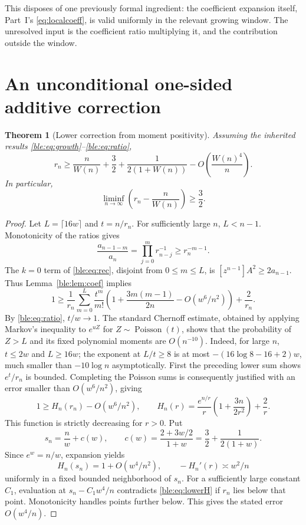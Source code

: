 \documentclass[11pt]{article}
\numberwithin{equation}{section}
\newtheorem{theorem}{Theorem}[section]
\theoremstyle{definition}
\theoremstyle{remark}
\begin{document}
This disposes of one previously formal ingredient: the coefficient
expansion itself, Part~I's \eqref{eq:localcoeff}, is valid uniformly in
the relevant growing window. The unresolved input is the coefficient ratio
multiplying it, and the contribution outside the window.

\section{An unconditional one-sided additive correction}\label{ble:sec:lower}
\begin{theorem}[Lower correction from moment positivity]\label{ble:thm:lower}
Assuming the inherited results \eqref{ble:eq:growth}--\eqref{ble:eq:ratio},
\begin{equation}\label{ble:eq:lower}
 r_n\ge \frac n{W(n)}+\frac32+\frac{1}{2(1+W(n))}
             -O\!\left(\frac{W(n)^4}{n}\right).
\end{equation}
In particular,
\[
 \liminf_{n\to\infty}\left(r_n-\frac n{W(n)}\right)\ge\frac32.
\]
\end{theorem}
\begin{proof}
Let $L=\lceil16w\rceil$ and $t=n/r_n$. For sufficiently large $n$,
$L<n-1$. Monotonicity of the ratios gives
\[
 \frac{a_{n-1-m}}{a_n}=\prod_{j=0}^{m}r_{n-j}^{-1}\ge r_n^{-m-1}.
\]
The $k=0$ term of \eqref{ble:eq:rec}, disjoint from $0\le m\le L$, is
$[z^{n-1}]A^2\ge2a_{n-1}$. Thus Lemma~\ref{ble:lem:coef} implies
\[
 1\ge \frac1{r_n}\sum_{m=0}^L\frac{t^m}{m!}
 \left(1+\frac{3m(m-1)}{2n}-O(w^6/n^2)\right)+\frac2{r_n}.
\]
By \eqref{ble:eq:ratio}, $t/w\to1$. The standard Chernoff estimate,
obtained by applying Markov's inequality to $e^{uZ}$ for
$Z\sim\operatorname{Poisson}(t)$, shows that the probability of $Z>L$ and
its fixed polynomial moments are $O(n^{-10})$. Indeed, for large $n$,
$t\le2w$ and $L\ge16w$; the exponent at $L/t\ge8$ is at most
$-(16\log8-16+2)w$, much smaller than $-10\log n$ asymptotically.
First the preceding lower sum shows $e^t/r_n$ is bounded. Completing the
Poisson sums is consequently justified with an error smaller than
$O(w^6/n^2)$, giving
\begin{equation}\label{ble:eq:lowerH}
 1\ge H_n(r_n)-O(w^6/n^2),\qquad
 H_n(r)=\frac{e^{n/r}}r\left(1+\frac{3n}{2r^2}\right)+\frac2r.
\end{equation}
This function is strictly decreasing for $r>0$. Put
\[
 s_n=\frac n w+c(w),\qquad
 c(w)=\frac{2+3w/2}{1+w}=\frac32+\frac1{2(1+w)}.
\]
Since $e^w=n/w$, expansion yields
\[
 H_n(s_n)=1+O(w^4/n^2),\qquad
 -H_n'(r)\asymp w^2/n
\]
uniformly in a fixed bounded neighborhood of $s_n$.
For a sufficiently large constant $C_1$, evaluation at $s_n-C_1w^4/n$
contradicts \eqref{ble:eq:lowerH} if $r_n$ lies below that point.
Monotonicity handles points further below. This gives the stated error
$O(w^4/n)$.
\end{proof}
\end{document}
